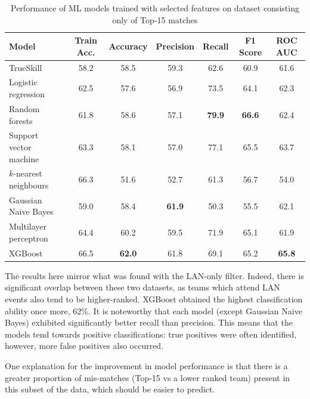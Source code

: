 \begin{table}[h!]
	\centering
	\small
	\begin{adjustbox}{center} %
		\begin{tabular}{ |l|c|c|c|c|c|c| }
			\hline
			\rule{0pt}{2.6ex} \textbf{Model} & \textbf{Train Acc.} & \textbf{Accuracy} & \textbf{Precision} & \textbf{Recall} & \textbf{F1 Score} & \textbf{ROC AUC} \\
			\hline
			\rule{0pt}{2.6ex} TrueSkill 				& 58.2 & 58.5 & 59.3 & 62.6 & 60.9 & 61.6 \\ \hline
			\rule{0pt}{2.6ex} Logistic regression 		& 62.5 & 57.6 & 56.9 & 73.5 & 64.1 & 62.3 \\
			\rule{0pt}{2.6ex} Random forests			& 61.8 & 58.6 & 57.1 & \textbf{79.9} & \textbf{66.6} & 62.4 \\
			\rule{0pt}{2.6ex} Support vector machine 	& 63.3 & 58.1 & 57.0 & 77.1 & 65.5 & 63.7 \\
			\rule{0pt}{2.6ex} $k$-nearest neighbours 	& 66.3 & 51.6 & 52.7 & 61.3 & 56.7 & 54.0 \\
			\rule{0pt}{2.6ex} Gaussian Naive Bayes 		& 59.0 & 58.4 & \textbf{61.9} & 50.3 & 55.5 & 62.1 \\
			\rule{0pt}{2.6ex} Multilayer perceptron     & 64.4 & 60.2 & 59.5 & 71.9 & 65.1 & 61.9 \\
			\rule{0pt}{2.6ex} XGBoost 					& 66.5 & \textbf{62.0} & 61.8 & 69.1 & 65.2 & \textbf{65.8} \\
			\hline
		\end{tabular}
	\end{adjustbox}
	\caption{Performance of ML models trained with selected features on dataset consisting only of Top-15 matches}
	\label{table:5}
\end{table}

The results here mirror what was found with the LAN-only filter. Indeed, there is significant overlap between these two datasets, as teams which attend LAN events also tend to be higher-ranked. XGBoost obtained the highest classification ability once more, 62\%. It is noteworthy that each model (except Gaussian Naive Bayes) exhibited significantly better recall than precision. This means that the models tend towards positive classifications: true positives were often identified, however, more false positives also occurred.

One explanation for the improvement in model performance is that there is a greater proportion of mis-matches (Top-15 vs a lower ranked team) present in this subset of the data, which should be easier to predict.

